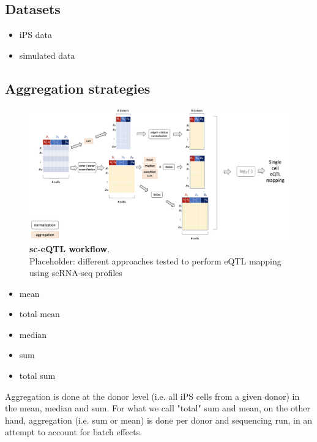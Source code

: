 \subsection{Datasets}

\begin{itemize}
    \item iPS data
    \item simulated data
\end{itemize}

\subsection{Aggregation strategies}


\begin{figure}[h]
\centering
\includegraphics[width=15cm]{Chapter3/Fig/sc_qtl_workflow.png}
\caption[\textbf{sc-eQTL workflow}]{\textbf{sc-eQTL workflow}.\\
Placeholder: different approaches tested to perform eQTL mapping using scRNA-seq profiles}
\label{fig:sc_qtl_workflow}
\end{figure}

\begin{itemize}
    \item mean
    \item total mean
    \item median
    \item sum
    \item total sum
\end{itemize}

Aggregation is done at the donor level (i.e. all iPS cells from a given donor) in the mean, median and sum.
For what we call "total" sum and mean, on the other hand, aggregation (i.e. sum or mean) is done per donor and sequencing run, in an attempt to account for batch effects.

